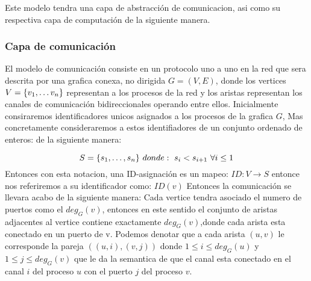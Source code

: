 \documentclass[10pt]{report}
\begin{document}
    Este modelo tendra una capa de abstracción de comunicacion, asi como su respectiva capa de
    computación de la siguiente manera.
    \subsubsection{Capa de comunicación}
    El modelo de comunicación consiste en un protocolo uno a uno en la red que sera descrita por
    una grafica conexa, no dirigida $G=(V,E)$, donde los vertices $V=\{ v_{1},\mathellipsis v_{n}\}$
    representan a los procesos de la red y los aristas representan los canales de comunicación bidireccionales
    operando entre ellos.
    Inicialmente consiraremos identificadores unicos asignados a los procesos de la grafica $G$,
    Mas concretamente consideraremos a estos identifiadores de un conjunto ordenado de enteros:
    de la siguiente manera:

    \begin{equation}
        S = \{ s_{1},\mathellipsis,s_{n}\} \
        donde:\ s_{i} < s_{i+1} \ \forall i\leq 1\label{eq:equation}
    \end{equation}
    Entonces con esta notacion, una ID-asignación es un mapeo:
    $ID:V\rightarrow S$ entonce nos referiremos a su identificador como:
    $ID(v)$
    Entonces la comunicación se llevara acabo de la siguiente manera:
    Cada vertice tendra asociado el numero de puertos como el $deg_{G}(v)$,
    entonces en este sentido el conjunto de aristas adjacentes al vertice
    contiene exactamente $deg_{G}(v)$,donde cada arista esta conectado en un puerto de v.
    \space
    Podemos denotar que a cada arista $(u,v)$ le corresponde la pareja
    $((u,i),(v,j))$ donde $1\leq i \leq deg_{G}(u) $ y $1\leq j \leq deg_{G}(v)$
    que le da la semantica de que el canal esta conectado en el canal $i$ del proceso $u$
    con el puerto $j$ del proceso $v$.
\end{document}
